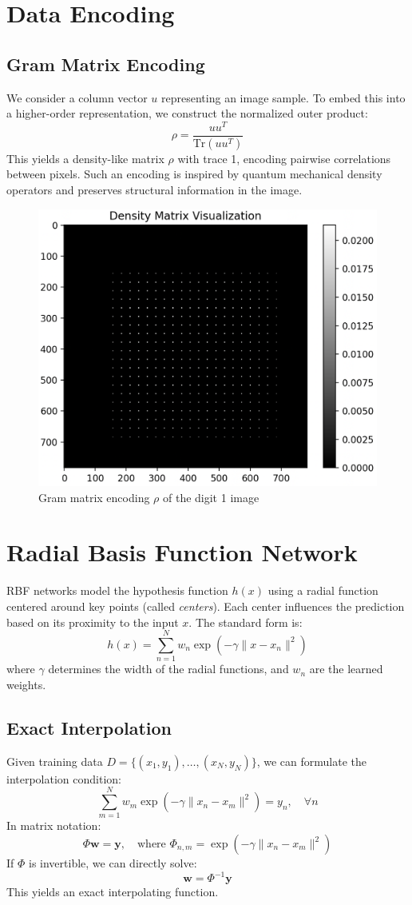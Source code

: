 \documentclass[twocolumn]{article} %
\begin{document}
\section{Data Encoding}
\subsection{Gram Matrix Encoding}

We consider a column vector $u$ representing an image sample. To embed this into a higher-order representation, we construct the normalized outer product:
\[
\rho = \frac{uu^T}{\text{Tr}(uu^T)}
\]
This yields a density-like matrix $\rho$ with trace 1, encoding pairwise correlations between pixels. Such an encoding is inspired by quantum mechanical density operators and preserves structural information in the image.

\begin{figure}[h!]
    \centering
    \includegraphics[width=0.6\linewidth]{figures/density_matrix_nmist_one.png}
    \caption{Gram matrix encoding $\rho$ of the digit 1 image}
    \label{fig:density_matrix}
\end{figure}

\section{Radial Basis Function Network}

RBF networks model the hypothesis function $h(x)$ using a radial function centered around key points (called \emph{centers}). Each center influences the prediction based on its proximity to the input $x$. The standard form is:
\[
h(x) = \sum_{n=1}^N w_n\exp\left(-\gamma\| x - x_n \|^2\right)
\]
where $\gamma$ determines the width of the radial functions, and $w_n$ are the learned weights.

\subsection{Exact Interpolation}
Given training data $D = \{(x_1, y_1), \dots, (x_N, y_N)\}$, we can formulate the interpolation condition:
\[
\sum_{m=1}^N w_m\exp\left(-\gamma\| x_n - x_m \|^2\right) = y_n, \quad \forall n
\]
In matrix notation:
\[
\Phi \mathbf{w} = \mathbf{y}, \quad \text{where } \Phi_{n,m} = \exp\left(-\gamma\|x_n - x_m\|^2\right)
\]
If $\Phi$ is invertible, we can directly solve:
\[
\mathbf{w} = \Phi^{-1} \mathbf{y}
\]
This yields an exact interpolating function.
\end{document}
